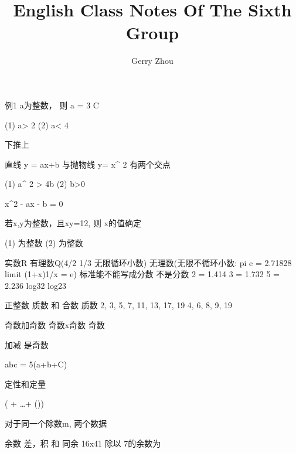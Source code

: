 \documentclass[fleqn]{article}
\title{English Class Notes Of The Sixth Group}
\author{Gerry Zhou}
\begin{document}
\maketitle

例1 a为整数， 则 a = 3  C

(1) a> 2
(2) a< 4

下推上


直线 y = ax+b 与抛物线 y= x^{ 2 } 有两个交点

(1) a^{ 2 } > 4b
(2) b>0

x^{2} - ax - b = 0


若x,y为整数，且xy=12, 则 x的值确定 

(1)  为整数
(2)  为整数


实数R 有理数Q(4/2  1/3  无限循环小数) 无理数(无限不循环小数: pi e  = 2.71828  limit (1+x)1/x = e) 标准能不能写成分数    不是分数
2 = 1.414 3 = 1.732  5 = 2.236  log32  log23  

正整数  质数 和 合数
质数  2, 3, 5, 7, 11, 13, 17, 19
4, 6, 8, 9, 19

奇数加奇数  
奇数x奇数 奇数

加减 是奇数


abc = 5(a+b+C)

定性和定量

( + \dots + ())


对于同一个除数m, 两个数据


余数 差，积  和 同余
16x41 除以 7的余数为
\end{document}
